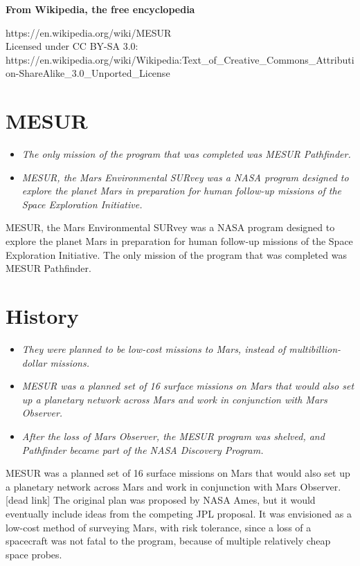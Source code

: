 \textbf{From Wikipedia, the free encyclopedia}

https://en.wikipedia.org/wiki/MESUR\\
Licensed under CC BY-SA 3.0:\\
https://en.wikipedia.org/wiki/Wikipedia:Text\_of\_Creative\_Commons\_Attribution-ShareAlike\_3.0\_Unported\_License

\section{MESUR}\label{mesur}

\begin{itemize}
\item
  \emph{The only mission of the program that was completed was MESUR
  Pathfinder.}
\item
  \emph{MESUR, the Mars Environmental SURvey was a NASA program designed
  to explore the planet Mars in preparation for human follow-up missions
  of the Space Exploration Initiative.}
\end{itemize}

MESUR, the Mars Environmental SURvey was a NASA program designed to
explore the planet Mars in preparation for human follow-up missions of
the Space Exploration Initiative. The only mission of the program that
was completed was MESUR Pathfinder.

\section{History}\label{history}

\begin{itemize}
\item
  \emph{They were planned to be low-cost missions to Mars, instead of
  multibillion-dollar missions.}
\item
  \emph{MESUR was a planned set of 16 surface missions on Mars that
  would also set up a planetary network across Mars and work in
  conjunction with Mars Observer.}
\item
  \emph{After the loss of Mars Observer, the MESUR program was shelved,
  and Pathfinder became part of the NASA Discovery Program.}
\end{itemize}

MESUR was a planned set of 16 surface missions on Mars that would also
set up a planetary network across Mars and work in conjunction with Mars
Observer.{[}dead link{]} The original plan was proposed by NASA Ames,
but it would eventually include ideas from the competing JPL proposal.
It was envisioned as a low-cost method of surveying Mars, with risk
tolerance, since a loss of a spacecraft was not fatal to the program,
because of multiple relatively cheap space probes.

